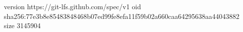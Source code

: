 version https://git-lfs.github.com/spec/v1
oid sha256:77e3b8e85483848468b07ed99fe8efa11f59b02a660caa64295638aa44043882
size 3145904
